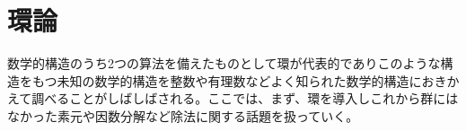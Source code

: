 \documentclass[a4paper]{jsarticle}
\begin{document}
\section{環論}
数学的構造のうち2つの算法を備えたものとして環が代表的でありこのような構造をもつ未知の数学的構造を整数や有理数などよく知られた数学的構造におきかえて調べることがしばしばされる。ここでは、まず、環を導入しこれから群にはなかった素元や因数分解など除法に関する話題を扱っていく。
\end{document}
